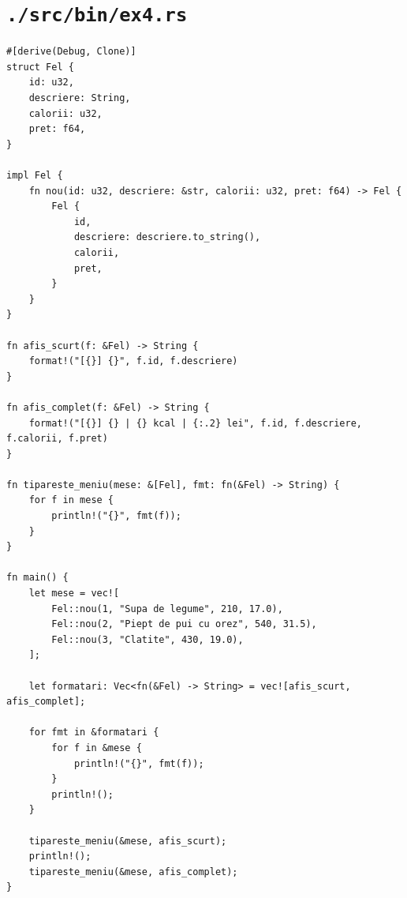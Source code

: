 \documentclass[11pt]{article}
\begin{document}
\section{\texttt{./src/bin/ex4.rs}}
\label{sec:orgfcc3500}
\begin{verbatim}
#[derive(Debug, Clone)]
struct Fel {
    id: u32,
    descriere: String,
    calorii: u32,
    pret: f64,
}

impl Fel {
    fn nou(id: u32, descriere: &str, calorii: u32, pret: f64) -> Fel {
        Fel {
            id,
            descriere: descriere.to_string(),
            calorii,
            pret,
        }
    }
}

fn afis_scurt(f: &Fel) -> String {
    format!("[{}] {}", f.id, f.descriere)
}

fn afis_complet(f: &Fel) -> String {
    format!("[{}] {} | {} kcal | {:.2} lei", f.id, f.descriere, f.calorii, f.pret)
}

fn tipareste_meniu(mese: &[Fel], fmt: fn(&Fel) -> String) {
    for f in mese {
        println!("{}", fmt(f));
    }
}

fn main() {
    let mese = vec![
        Fel::nou(1, "Supa de legume", 210, 17.0),
        Fel::nou(2, "Piept de pui cu orez", 540, 31.5),
        Fel::nou(3, "Clatite", 430, 19.0),
    ];

    let formatari: Vec<fn(&Fel) -> String> = vec![afis_scurt, afis_complet];

    for fmt in &formatari {
        for f in &mese {
            println!("{}", fmt(f));
        }
        println!();
    }

    tipareste_meniu(&mese, afis_scurt);
    println!();
    tipareste_meniu(&mese, afis_complet);
}
\end{verbatim}
\end{document}
